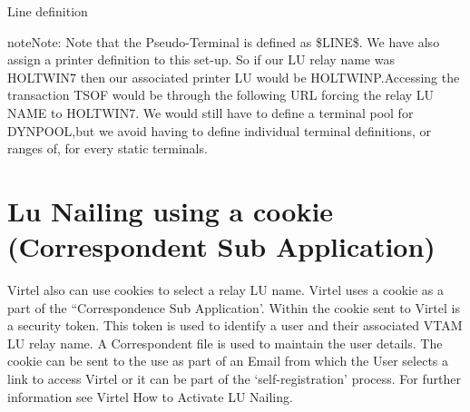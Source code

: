 \documentclass[letterpaper,10pt,english]{sphinxmanual}
\begin{document}
Line definition






\begin{sphinxadmonition}{note}{Note:}
Note that the Pseudo-Terminal is defined as \$LINE\$. We have also assign a printer definition to this set-up. So if our LU relay name was HOLTWIN7 then our associated printer LU would be HOLTWINP.Accessing the transaction TSOF would be through the following URL forcing the relay LU NAME to HOLTWIN7. We would still have to define a terminal pool for DYNPOOL,but we avoid having to define individual terminal definitions, or ranges of, for every static terminals.
\end{sphinxadmonition}


\ignorespaces 

\section{Lu Nailing using a cookie (Correspondent Sub Application)}
\label{\detokenize{Customization:lu-nailing-using-a-cookie-correspondent-sub-application}}\label{\detokenize{Customization:index-60}}
Virtel also can use cookies to select a relay LU name. Virtel uses a cookie as a part of the “Correspondence Sub Application’. Within the cookie sent to Virtel is a security token. This token is used to identify a user and their associated VTAM LU relay name. A Correspondent file is used to maintain the user details. The cookie can be sent to the use as part of an Email from which the User selects a link to access Virtel or it can be part of the ‘self-registration’ process. For further information see Virtel \textendash{} How to Activate LU Nailing.

\ignorespaces 
\end{document}
